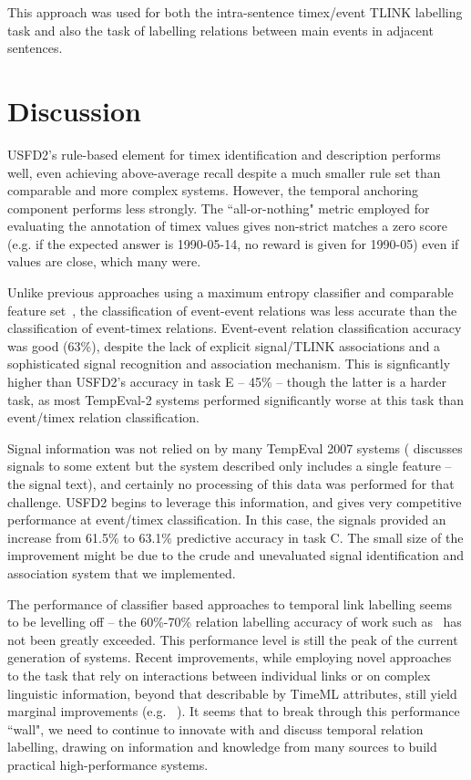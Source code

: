 \documentclass[11pt]{article}
\begin{document}
This approach was used for both the intra-sentence timex/event TLINK labelling task and also the task of labelling relations between main events in adjacent sentences.

\section{Discussion}
\label{discussion}
USFD2's rule-based element for timex identification and description performs well, even achieving above-average recall despite a much smaller rule set than comparable and more complex systems. However, the temporal anchoring component performs less strongly. The ``all-or-nothing" metric employed for evaluating the annotation of timex values gives non-strict matches a zero score (e.g. if the expected answer is 1990-05-14, no reward is given for 1990-05) even if values are close, which many were.

Unlike previous approaches using a maximum entropy classifier and comparable feature set~\cite{mani2006machine,derczynski2010signals}, the classification of event-event relations was less accurate than the classification of event-timex relations. Event-event relation classification accuracy was good (63\%), despite the lack of explicit signal/TLINK associations and a sophisticated signal recognition and association mechanism. This is signficantly higher than USFD2's accuracy in task E -- 45\% -- though the latter is a harder task, as most TempEval-2 systems performed significantly worse at this task than event/timex relation classification.

Signal information was not relied on by many TempEval 2007 systems ( discusses signals to some extent but the system described only includes a single feature -- the signal text), and certainly no processing of this data was performed for that challenge. USFD2 begins to leverage this information, and gives very competitive performance at event/timex classification. In this case, the signals provided an increase from 61.5\% to 63.1\% predictive accuracy in task C. The small size of the improvement might be due to the crude and unevaluated signal identification and association system that we implemented.

The performance of classifier based approaches to temporal link labelling seems to be levelling off -- the 60\%-70\% relation labelling accuracy of work such as~ has not been greatly exceeded. This performance level is still the peak of the current generation of systems. Recent improvements, while employing novel approaches to the task that rely on interactions between individual links or on complex linguistic information, beyond that describable by TimeML attributes, still yield marginal improvements (e.g. ~). It seems that to break through this performance ``wall", we need to continue to innovate with and discuss temporal relation labelling, drawing on information and knowledge from many sources to build practical high-performance systems.
\end{document}
